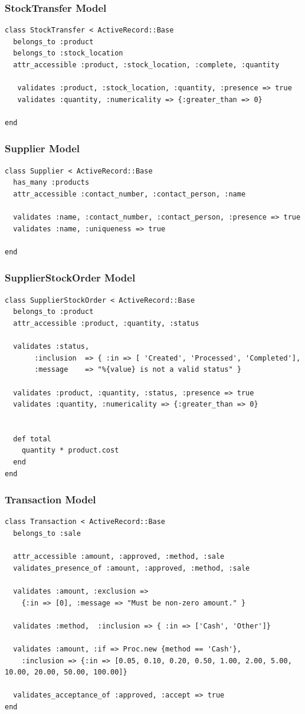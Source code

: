 \documentclass[a4paper]{article}
\begin{document}
\subsubsection{StockTransfer Model}
\begin{verbatim}
class StockTransfer < ActiveRecord::Base
  belongs_to :product
  belongs_to :stock_location
  attr_accessible :product, :stock_location, :complete, :quantity

   validates :product, :stock_location, :quantity, :presence => true
   validates :quantity, :numericality => {:greater_than => 0}

end

\end{verbatim}
\subsubsection{Supplier Model}
\begin{verbatim}
class Supplier < ActiveRecord::Base
  has_many :products
  attr_accessible :contact_number, :contact_person, :name

  validates :name, :contact_number, :contact_person, :presence => true
  validates :name, :uniqueness => true

end

\end{verbatim}
\subsubsection{SupplierStockOrder Model}
\begin{verbatim}
class SupplierStockOrder < ActiveRecord::Base
  belongs_to :product
  attr_accessible :product, :quantity, :status

  validates :status,
       :inclusion  => { :in => [ 'Created', 'Processed', 'Completed'],
       :message    => "%{value} is not a valid status" }

  validates :product, :quantity, :status, :presence => true
  validates :quantity, :numericality => {:greater_than => 0}


  def total
  	quantity * product.cost
  end
end

\end{verbatim}
\subsubsection{Transaction Model}
\begin{verbatim}
class Transaction < ActiveRecord::Base
  belongs_to :sale

  attr_accessible :amount, :approved, :method, :sale
  validates_presence_of :amount, :approved, :method, :sale

  validates :amount, :exclusion =>
  	{:in => [0], :message => "Must be non-zero amount." }

  validates :method,  :inclusion => { :in => ['Cash', 'Other']}

  validates :amount, :if => Proc.new {method == 'Cash'},
  	:inclusion => {:in => [0.05, 0.10, 0.20, 0.50, 1.00, 2.00, 5.00, 10.00, 20.00, 50.00, 100.00]}

  validates_acceptance_of :approved, :accept => true
end

\end{verbatim}
\end{document}
